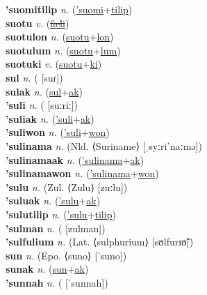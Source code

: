 \textbf{'suomitilip} \textit{n.} (\hyperref['suomi]{'suomi}+\hyperref[tilip]{tilip})
 \label{'suomitilip} \\
\textbf{suotu} \textit{v.} (\hyperref[fieli]{\sout{fieli}})
 \label{suotu} \\
\textbf{suotulon} \textit{n.} (\hyperref[suotu]{suotu}+\hyperref[lon]{lon})
 \label{suotulon} \\
\textbf{suotulum} \textit{n.} (\hyperref[suotu]{suotu}+\hyperref[lum]{lum})
 \label{suotulum} \\
\textbf{suotuki} \textit{v.} (\hyperref[suotu]{suotu}+\hyperref[ki]{ki})
 \label{suotuki} \\
\textbf{sul} \textit{n.} ( [suɾ])
 \label{sul} \\
\textbf{sulak} \textit{n.} (\hyperref[sul]{sul}+\hyperref[ak]{ak})
 \label{sulak} \\
\textbf{'suli} \textit{n.} ( [suːriː])
 \label{'suli} \\
\textbf{'suliak} \textit{n.} (\hyperref['suli]{'suli}+\hyperref[ak]{ak})
 \label{'suliak} \\
\textbf{'suliwon} \textit{n.} (\hyperref['suli]{'suli}+\hyperref[won]{won})
 \label{'suliwon} \\
\textbf{'sulinama} \textit{n.} (Nld. ⟨Suriname⟩ [ˌsyːriˈnaːmə])
 \label{'sulinama} \\
\textbf{'sulinamaak} \textit{n.} (\hyperref['sulinama]{'sulinama}+\hyperref[ak]{ak})
 \label{'sulinamaak} \\
\textbf{'sulinamawon} \textit{n.} (\hyperref['sulinama]{'sulinama}+\hyperref[won]{won})
 \label{'sulinamawon} \\
\textbf{'sulu} \textit{n.} (Zul. ⟨Zulu⟩ [zuːlu])
 \label{'sulu} \\
\textbf{'suluak} \textit{n.} (\hyperref['sulu]{'sulu}+\hyperref[ak]{ak})
 \label{'suluak} \\
\textbf{'sulutilip} \textit{n.} (\hyperref['sulu]{'sulu}+\hyperref[tilip]{tilip})
 \label{'sulutilip} \\
\textbf{'sulman} \textit{n.} ( [zulman])
 \label{'sulman} \\
\textbf{'sulfulium} \textit{n.} (Lat. ⟨sulphurium⟩ [sʊlfurɪʊ̃])
 \label{'sulfulium} \\
\textbf{sun} \textit{n.} (Epo. ⟨suno⟩ [ˈsuno])
 \label{sun} \\
\textbf{sunak} \textit{n.} (\hyperref[sun]{sun}+\hyperref[ak]{ak})
 \label{sunak} \\
\textbf{'sunnah} \textit{n.} ( [ˈsunnah])
